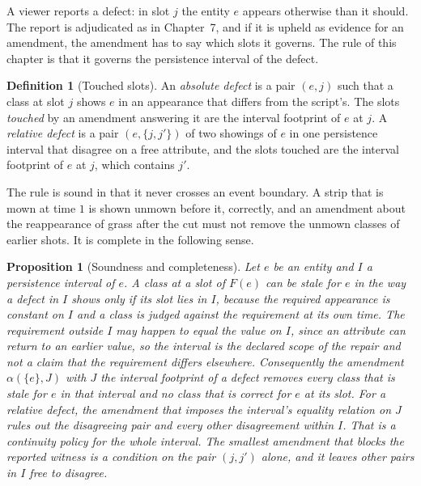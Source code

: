 \documentclass[11pt,twoside,openright]{book}
\theoremstyle{plain}
\newtheorem{proposition}[theorem]{Proposition}
\theoremstyle{definition}
\newtheorem{definition}[theorem]{Definition}
\theoremstyle{remark}
\begin{document}
A viewer reports a defect: in slot $j$ the entity $e$ appears otherwise than it should. The report is adjudicated as in Chapter~7, and if it is upheld as evidence for an amendment, the amendment has to say which slots it governs. The rule of this chapter is that it governs the persistence interval of the defect.

\begin{definition}[Touched slots]\label{def:touched}
An \emph{absolute defect} is a pair $(e,j)$ such that a class at slot $j$ shows $e$ in an appearance that differs from the script's. The slots \emph{touched} by an amendment answering it are the interval footprint of $e$ at $j$. A \emph{relative defect} is a pair $(e,\{j,j'\})$ of two showings of $e$ in one persistence interval that disagree on a free attribute, and the slots touched are the interval footprint of $e$ at $j$, which contains $j'$.
\end{definition}

The rule is sound in that it never crosses an event boundary. A strip that is mown at time $1$ is shown unmown before it, correctly, and an amendment about the reappearance of grass after the cut must not remove the unmown classes of earlier shots. It is complete in the following sense.

\begin{proposition}[Soundness and completeness]\label{prop:sound}
Let $e$ be an entity and $I$ a persistence interval of $e$. A class at a slot of $F(e)$ can be stale for $e$ in the way a defect in $I$ shows only if its slot lies in $I$, because the required appearance is constant on $I$ and a class is judged against the requirement at its own time. The requirement outside $I$ may happen to equal the value on $I$, since an attribute can return to an earlier value, so the interval is the declared scope of the repair and not a claim that the requirement differs elsewhere. Consequently the amendment $\alpha(\{e\},J)$ with $J$ the interval footprint of a defect removes every class that is stale for $e$ in that interval and no class that is correct for $e$ at its slot. For a relative defect, the amendment that imposes the interval's equality relation on $J$ rules out the disagreeing pair and every other disagreement within $I$. That is a continuity policy for the whole interval. The smallest amendment that blocks the reported witness is a condition on the pair $(j,j')$ alone, and it leaves other pairs in $I$ free to disagree.
\end{proposition}
\end{document}

